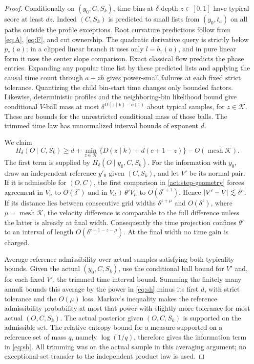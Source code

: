 \begin{proof}
Conditionally on $(y_0,C,S_k)$, time bins at $\delta$-depth
$z\in[0,1]$ have typical score at least $dz$.
Indeed $(C,S_k)$ is predicted to small lists from $(y_0,t_a)$ on
all paths outside the profile exceptions.  Root curvature
predictions follow from \eqref{eq:A}, \eqref{eq:F}, and cut
ownership.  The quadratic derivative query is strictly below
$p_*(a)$; in a clipped linear branch it uses only $l=b_1(a)$,
and in pure linear form it uses the center slope comparison.
Exact classical flow predicts the phase entries.  Expanding any
popular time list by these predicted lists and applying the causal
time count through $a+zh$ gives power-small failures at each fixed
strict tolerance.  Quantizing the child bin-start time changes
only bounded factors.  Likewise, deterministic profiles and the
neighboring-bin likelihood bound give conditional $V$-ball mass
at most $\delta^{D(z\mid k)-o(1)}$ about typical samples, for
$z\in\mathcal K$.  These are bounds for the unrestricted
conditional mass of those balls.  The trimmed time law has
unnormalized interval bounds of exponent $d$.

We claim
\begin{equation}
 H_\delta(O\mid C,S_k)
 \ge d+\min_{z\in\mathcal K}
       \{D(z\mid k)+d(c+1-z)\}
       -O(\operatorname{mesh}\mathcal K).
 \tag{sh}\label{eq:sh}
\end{equation}
The first term is supplied by $H_\delta(O\mid y_0,C,S_k)$.
For the information with $y_0$, draw an independent reference
$y'_0$ given $(C,S_k)$, and let $V'$ be its normal pair.  If it
is admissible for $(O,C)$, the first comparison in
\eqref{act:step-geometry} forces agreement in $V_n$ to
$O(\delta^c)$ and in $V_d+\theta'V_n$ to
$O(\delta^{c+1})$.  Hence $\lvert V'-V\rvert\lesssim\delta^c$.
If its distance lies between consecutive grid widths
$\delta^{z+\mu}$ and $O(\delta^z)$, where
$\mu=\operatorname{mesh}\mathcal K$, the velocity difference
is comparable to the full difference unless the latter is already
at final width.  Consequently the time projection confines
$\theta'$ to an interval of length
$O(\delta^{c+1-z-\mu})$.  At the final width no time gain is
charged.

Average reference admissibility over actual samples satisfying
both typicality bounds.  Given the actual $(y_0,C,S_k)$, use the
conditional ball bound for $V'$ and, for each fixed $V'$, the
trimmed time interval bound.  Summing the finitely many annuli
bounds this average by the power in \eqref{eq:sh} minus its first
$d$, with strict tolerance and the $O(\mu)$ loss.  Markov's
inequality makes the reference admissibility probability at most
that power with slightly more tolerance for most actual
$(O,C,S_k)$.  The actual posterior given $(O,C,S_k)$ is supported
on the admissible set.  The relative entropy bound for a measure
supported on a reference set of mass $q$, namely $\log(1/q)$,
therefore gives the information term in \eqref{eq:sh}.  All
trimming was on the actual sample in this averaging argument;
no exceptional-set transfer to the independent product law is used.


\end{proof}
